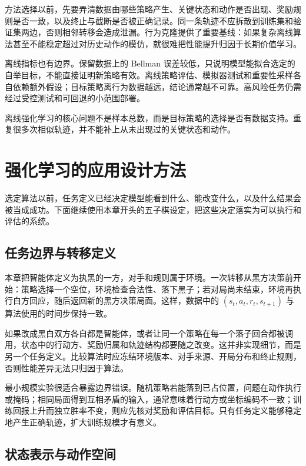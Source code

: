\documentclass[UTF8,a4paper,zihao=-4,oneside,openany]{ctexbook}
\begin{document}
方法选择以前，先要弄清数据由哪些策略产生、关键状态和动作是否出现、奖励规则是否一致，以及终止与截断是否被正确记录。同一条轨迹不应拆散到训练集和验证集两边，否则相邻转移会造成泄漏。行为克隆提供了重要基线：如果复杂离线算法甚至不能稳定超过对历史动作的模仿，就很难把性能提升归因于长期价值学习。

离线指标也有边界。保留数据上的 Bellman 误差较低，只说明模型能拟合选定的自举目标，不能直接证明新策略有效。离线策略评估、模拟器测试和重要性采样各自依赖额外假设；目标策略离行为数据越远，结论通常越不可靠。高风险任务仍需经过受控测试和可回退的小范围部署。

\begin{importantnote}
  离线强化学习的核心问题不是样本总数，而是目标策略的选择是否有数据支持。重复很多次相似轨迹，并不能补上从未出现过的关键状态和动作。
\end{importantnote}

\section{强化学习的应用设计方法}

选定算法以前，任务定义已经决定模型能看到什么、能改变什么，以及什么结果会被当成成功。下面继续使用本章开头的五子棋设定，把这些决定落实为可以执行和评估的系统。

\subsection{任务边界与转移定义}

本章把智能体定义为执黑的一方，对手和规则属于环境。一次转移从黑方决策前开始：策略选择一个空位，环境检查合法性、落下黑子；若对局尚未结束，环境再执行白方回应，随后返回新的黑方决策局面。这样，数据中的 $(s_t,a_t,r_t,s_{t+1})$ 与算法使用的时间步保持一致。

如果改成黑白双方各自都是智能体，或者让同一个策略在每一个落子回合都被调用，状态中的行动方、奖励归属和轨迹结构都要随之改变。这并非实现细节，而是另一个任务定义。比较算法时应冻结环境版本、对手来源、开局分布和终止规则，否则性能差异无法只归因于算法。

最小规模实验很适合暴露边界错误。随机策略若能落到已占位置，问题在动作执行或掩码；相同局面得到互相矛盾的输入，通常意味着行动方或坐标编码不一致；训练回报上升而独立胜率不变，则应先核对奖励和评估目标。只有任务定义能够稳定地产生正确轨迹，扩大训练规模才有意义。

\subsection{状态表示与动作空间}
\end{document}

